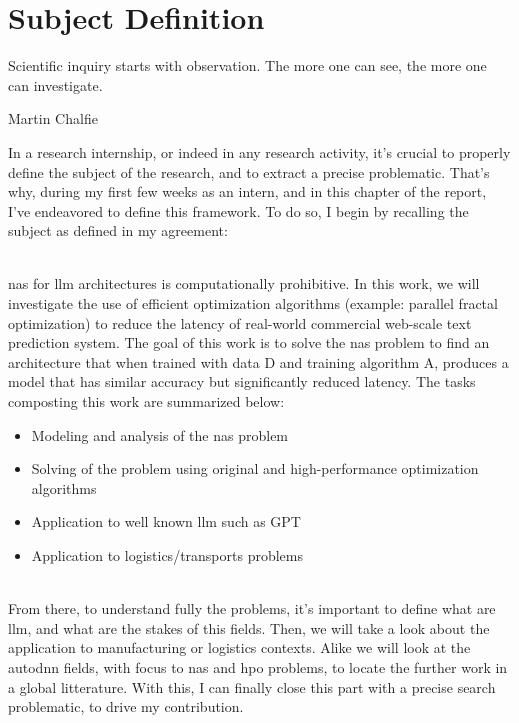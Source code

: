 \chapter{Subject Definition}
\label{chap:subject_def}

\epigraph{Scientific inquiry starts with observation. The more one can see, the more one can investigate.}{Martin Chalfie}

In a research internship, or indeed in any research activity, it's crucial to properly define the subject of the research, and to extract a precise problematic. That's why, during my first few weeks as an intern, and in this chapter of the report, I've endeavored to define this framework. To do so, I begin by recalling the subject as defined in my agreement: 

\noindent\hrulefill\\

\acrshort{nas} for \acrshort{llm} architectures is computationally prohibitive. In this work, we will investigate the use of efficient optimization algorithms (example: parallel fractal optimization) to reduce the latency of real-world commercial web-scale text prediction system. The goal of this work is to solve the \acrshort{nas} problem to find an architecture that when trained with data D and training algorithm A, produces a model that has similar accuracy but significantly reduced latency.
The tasks composting this work are summarized below:
\begin{itemize}
    \item Modeling and analysis of the \acrshort{nas} problem
    \item Solving of the problem using original and high-performance optimization algorithms
    \item Application to well known \acrshort{llm} such as GPT
    \item Application to logistics/transports problems
\end{itemize}
\noindent\hrulefill\\



From there, to understand fully the problems, it's important to define what are \acrshort{llm}, and what are the stakes of this fields. Then, we will take a look about the application to manufacturing or logistics contexts. Alike we will look at the \acrshort{autodnn} fields, with focus to \acrshort{nas} and \acrshort{hpo} problems, to locate the further work in a global litterature. With this, I can finally close this part with a precise search problematic, to drive my contribution.


